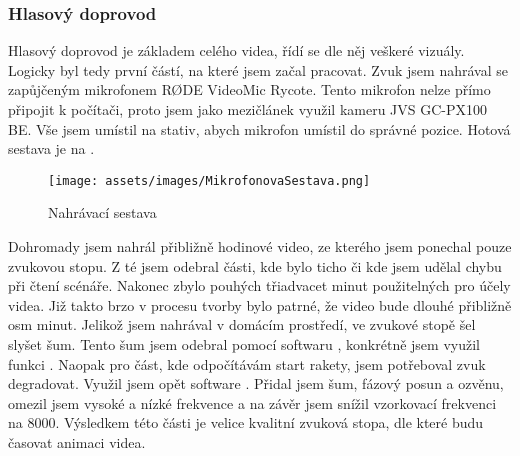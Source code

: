 \subsubsection{Hlasový doprovod}
{Hlasový doprovod je základem celého videa, řídí se dle něj veškeré vizuály. Logicky byl tedy první částí, na které jsem začal pracovat.}\odst
{Zvuk jsem nahrával se zapůjčeným mikrofonem RØDE VideoMic Rycote. Tento mikrofon nelze přímo připojit k počítači, proto jsem jako mezičlánek využil kameru JVS GC-PX100 BE. Vše jsem umístil na stativ, abych mikrofon umístil do správné pozice. Hotová sestava je na .}
\begin{figure}[H]
    \centering
    \texttt{[image: assets/images/MikrofonovaSestava.png]}
    \caption{Nahrávací sestava \jaFoto}
    \label{obr:nahravaciSestava}
\end{figure}
{Dohromady jsem nahrál přibližně hodinové video, ze kterého jsem ponechal pouze zvukovou stopu. Z té jsem odebral části, kde bylo ticho či kde jsem udělal chybu při čtení scénáře. Nakonec zbylo pouhých třiadvacet minut použitelných pro účely videa. Již takto brzo v procesu tvorby bylo patrné, že video bude dlouhé přibližně osm minut.}\odst
{Jelikož jsem nahrával v domácím prostředí, ve zvukové stopě šel slyšet šum. Tento šum jsem odebral pomocí softwaru , konkrétně jsem využil funkci .}\odst
{Naopak pro část, kde odpočítávám start rakety, jsem potřeboval zvuk degradovat. Využil jsem opět software . Přidal jsem šum, fázový posun a ozvěnu, omezil jsem vysoké a nízké frekvence a na závěr jsem snížil vzorkovací frekvenci na 8000.}\odst
{Výsledkem této části je velice kvalitní zvuková stopa, dle které budu časovat animaci videa.}
\newpage

